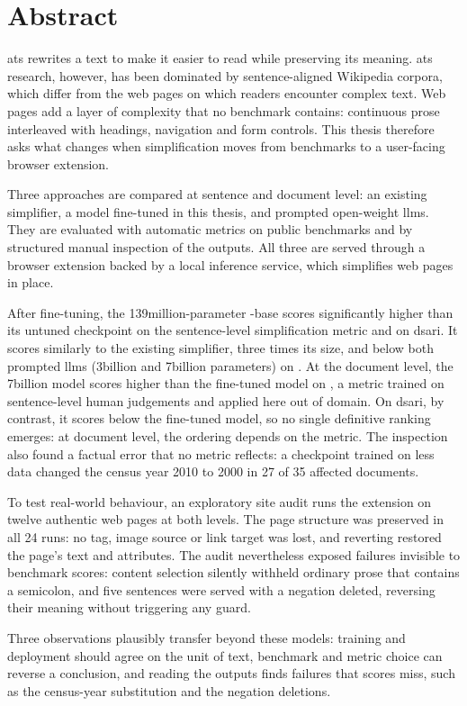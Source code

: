\chapter*{Abstract}
\label{sec:abstract}
\Gls{ats} rewrites a text to make it easier to read while preserving its meaning.
\Gls{ats} research, however, has been dominated by sentence-aligned Wikipedia corpora, which differ from the web pages on which readers encounter complex text.
Web pages add a layer of complexity that no benchmark contains: continuous prose interleaved with headings, navigation and form controls.
This thesis therefore asks what changes when simplification moves from benchmarks to a user-facing browser extension.

Three approaches are compared at sentence and document level: an existing simplifier, a  model fine-tuned in this thesis, and prompted open-weight \glspl{llm}.
They are evaluated with automatic metrics on public benchmarks and by structured manual inspection of the outputs.
All three are served through a browser extension backed by a local inference service, which simplifies web pages in place.

After fine-tuning, the 139\gls{million}-parameter -base scores significantly higher than its untuned checkpoint on the sentence-level simplification metric  and on \gls{dsari}.
It scores similarly to the existing simplifier, three times its size, and below both prompted \glspl{llm} (3\gls{billion} and 7\gls{billion} parameters) on .
At the document level, the 7\gls{billion} model scores higher than the fine-tuned model on , a metric trained on sentence-level human judgements and applied here out of domain.
On \gls{dsari}, by contrast, it scores below the fine-tuned model, so no single definitive ranking emerges: at document level, the ordering depends on the metric.
The inspection also found a factual error that no metric reflects: a checkpoint trained on less data changed the census year 2010 to 2000 in 27 of 35 affected documents.

To test real-world behaviour, an exploratory site audit runs the extension on twelve authentic web pages at both levels.
The page structure was preserved in all 24 runs: no tag, image source or link target was lost, and reverting restored the page's text and attributes.
The audit nevertheless exposed failures invisible to benchmark scores: content selection silently withheld ordinary prose that contains a semicolon, and five sentences were served with a negation deleted, reversing their meaning without triggering any guard.

Three observations plausibly transfer beyond these models: training and deployment should agree on the unit of text, benchmark and metric choice can reverse a conclusion, and reading the outputs finds failures that scores miss, such as the census-year substitution and the negation deletions.